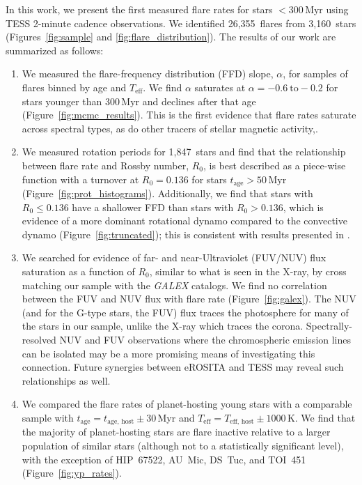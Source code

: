 \documentclass[twocolumn]{aastex631}
\newcommand{\nflares}{26,355}
\newcommand{\nflarestars}{3,160}
\newcommand{\nprot}{1,847}
\begin{document}
In this work, we present the first measured flare rates for stars $< 300$\,Myr using TESS 2-minute cadence observations. We identified \nflares\ flares from \nflarestars\ stars (Figures~\ref{fig:sample} and \ref{fig:flare_distribution}). The results of our work are summarized as follows:

\begin{enumerate}
  \item We measured the flare-frequency distribution (FFD) slope, $\alpha$, for samples of flares binned by age and $T_\textrm{eff}$. We find $\alpha$ saturates at $\alpha = -0.6 ~ \textrm{to} -0.2$ for stars younger than 300\,Myr and declines after that age (Figure~\ref{fig:mcmc_results}). This is the first evidence that flare rates saturate across spectral types, as do  other tracers of stellar magnetic activity,.

  \item We measured rotation periods for \nprot\ stars and find that the relationship between flare rate and Rossby number, $R_0$, is best described as a piece-wise function with a turnover at $R_0 = 0.136$ for stars $t_\textrm{age} > 50$\,Myr (Figure~\ref{fig:prot_histograms}). Additionally, we find that stars with $R_0 \leq 0.136$ have a shallower FFD than stars with $R_0 > 0.136$, which is evidence of a more dominant rotational dynamo compared to the convective dynamo (Figure~\ref{fig:truncated}); this is consistent with results presented in \cite{seligman22}.

  \item We searched for evidence of far- and near-Ultraviolet (FUV/NUV) flux saturation as a function of $R_0$, similar to what is seen in the X-ray, by cross matching our sample with the \textit{GALEX} catalogs. We find no correlation between the FUV and NUV flux with flare rate (Figure~\ref{fig:galex}). The NUV (and for the G-type stars, the FUV) flux traces the photosphere for many of the stars in our sample, unlike the X-ray which traces the corona.  Spectrally-resolved NUV and FUV observations where the chromospheric emission lines can be  isolated may be a more promising means of investigating this connection. Future synergies between eROSITA and TESS may reveal such relationships as well.

  \item We compared the flare rates of planet-hosting young stars with a comparable sample with $t_\text{age} = t_\textrm{age, host} \pm 30$\,Myr and $T_\textrm{eff} = T_\textrm{eff, host} \pm 1000$\,K. We find that the majority of planet-hosting stars are flare inactive relative to a larger population of similar stars (although not to a statistically significant level), with the exception of HIP~67522, AU~Mic, DS~Tuc, and TOI~451 (Figure~\ref{fig:yp_rates}).


\end{enumerate}
\end{document}
